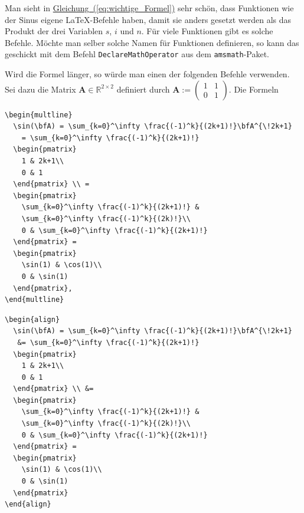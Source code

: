 \documentclass[12pt]{article}
\theoremstyle{definition}
\numberwithin{equation}{section}
\newcommand{\R}{\mathbb{R}}
\newcommand{\bfA}{\mathbf{A}}
\begin{document}
Man sieht in
\hyperref[eq:wichtige_Formel]{Gleichung~(\ref*{eq:wichtige_Formel})}
sehr schön, dass Funktionen wie der Sinus eigene \LaTeX-Befehle haben,
damit sie anders gesetzt werden als das Produkt der drei Variablen
$s$, $i$ und $n$. Für viele Funktionen gibt es solche Befehle. Möchte
man selber solche Namen für Funktionen definieren, so kann das
geschickt mit dem Befehl \texttt{DeclareMathOperator} aus dem
\texttt{amsmath}-Paket.

Wird die Formel länger, so würde man einen der folgenden Befehle
verwenden. Sei dazu die Matrix $\bfA\in\R^{2\times2}$ definiert durch
$\bfA:=(\begin{smallmatrix}1&1\\0&1\end{smallmatrix})$. Die Formeln
\begin{verbatim}
\begin{multline}
  \sin(\bfA) = \sum_{k=0}^\infty \frac{(-1)^k}{(2k+1)!}\bfA^{\!2k+1}
    = \sum_{k=0}^\infty \frac{(-1)^k}{(2k+1)!}
  \begin{pmatrix}
    1 & 2k+1\\
    0 & 1
  \end{pmatrix} \\ =
  \begin{pmatrix}
    \sum_{k=0}^\infty \frac{(-1)^k}{(2k+1)!} &
    \sum_{k=0}^\infty \frac{(-1)^k}{(2k)!}\\
    0 & \sum_{k=0}^\infty \frac{(-1)^k}{(2k+1)!}
  \end{pmatrix} =
  \begin{pmatrix}
    \sin(1) & \cos(1)\\
    0 & \sin(1)
  \end{pmatrix},
\end{multline}
\end{verbatim}
\begin{verbatim}
\begin{align}
  \sin(\bfA) = \sum_{k=0}^\infty \frac{(-1)^k}{(2k+1)!}\bfA^{\!2k+1}
   &= \sum_{k=0}^\infty \frac{(-1)^k}{(2k+1)!}
  \begin{pmatrix}
    1 & 2k+1\\
    0 & 1
  \end{pmatrix} \\ &=
  \begin{pmatrix}
    \sum_{k=0}^\infty \frac{(-1)^k}{(2k+1)!} &
    \sum_{k=0}^\infty \frac{(-1)^k}{(2k)!}\\
    0 & \sum_{k=0}^\infty \frac{(-1)^k}{(2k+1)!}
  \end{pmatrix} =
  \begin{pmatrix}
    \sin(1) & \cos(1)\\
    0 & \sin(1)
  \end{pmatrix}
\end{align}
\end{verbatim}
\end{document}
